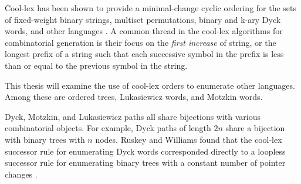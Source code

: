 Cool-lex has been shown to provide a minimal-change cyclic ordering for the sets of fixed-weight binary strings, multiset permutations, binary and k-ary Dyck words, and other languages \cite{williams2009shift}. A common thread in the cool-lex algorithms for combinatorial generation is their focus on the \emph{first increase} of string, or the longest prefix of a string such that each successive symbol in the prefix is less than or equal to the previous symbol in the string.

This thesis will examine the use of cool-lex orders to enumerate other languages. Among these are ordered trees, Lukasiewicz words, and Motzkin words. 


Dyck, Motzkin, and Lukasiewicz paths all share bijections with various combinatorial objects. For example, Dyck paths of length $2n$ share a bijection with binary trees with $n$ nodes. Ruskey and Williams found that the cool-lex successor rule for enumerating Dyck words corresponded directly to a loopless successor rule for enumerating binary trees with a constant number of pointer changes \cite{ruskey2008generating}. %


